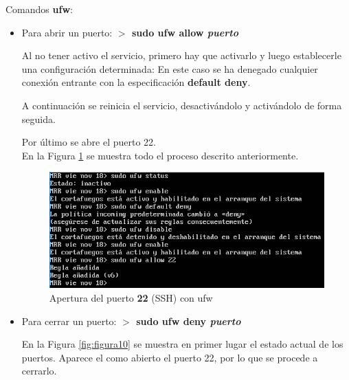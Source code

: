 Comandos \textbf{ufw}\cite{enlace12}:
\begin{itemize}
	\item Para abrir un puerto: \textbf{$ > $ sudo ufw allow \textit{puerto}}\cite{enlace12}
	
	Al no tener activo el servicio, primero hay que activarlo y luego establecerle
	una configuración determinada: En este caso se ha denegado cualquier conexión entrante con la especificación \textbf{default deny}.
	
	A continuación se reinicia el servicio, desactivándolo y activándolo de forma seguida.
	
	Por último se abre el puerto 22.
	\\
	
	En la Figura \ref{fig:figura9} se muestra todo el proceso descrito anteriormente.
	\begin{figure}[H] %
		\centering
		\includegraphics[scale=0.8]{figuras/figura9.png} 
		\caption{Apertura del puerto \textbf{22} (SSH) con ufw} 
		\label{fig:figura9}
	\end{figure}
		
	\item Para cerrar un puerto: \textbf{$ > $ sudo ufw deny \textit{puerto}}\cite{enlace12}
	
	En la Figura \ref{fig:figura10} se muestra en primer lugar el estado actual de los puertos. Aparece el como abierto el puerto 22, por lo que se procede a cerrarlo.
	

\end{itemize}
